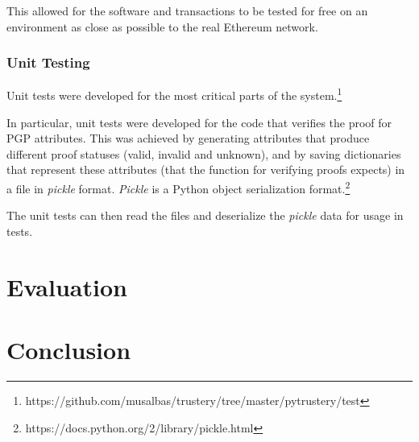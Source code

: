 \documentclass[12pt,a4paper]{report}
\begin{document}
	This allowed for the software and transactions to be tested for free on an environment as close as possible to the real Ethereum network.
	
	\subsection{Unit Testing}
	Unit tests were developed for the most critical parts of the system.\footnote{https://github.com/musalbas/trustery/tree/master/pytrustery/test}
	
	In particular, unit tests were developed for the code that verifies the proof for PGP attributes. This was achieved by generating attributes that produce different proof statuses (valid, invalid and unknown), and by saving dictionaries that represent these attributes (that the function for verifying proofs expects) in a file in \textit{pickle} format. \textit{Pickle} is a Python object serialization format.\footnote{https://docs.python.org/2/library/pickle.html}
	
	The unit tests can then read the files and deserialize the \textit{pickle} data for usage in tests.
	
	\chapter{Evaluation}
	
	\chapter{Conclusion}
	
	
	
	
	\appendix
\end{document}

